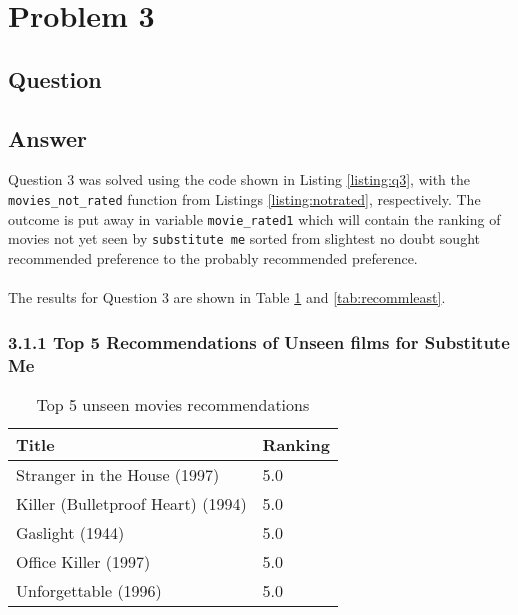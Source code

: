 \section{Problem 3}

\subsection{Question}
\vspace*{10pt}


\subsection{Answer}
\vspace{2mm}
Question 3 was solved using the code shown in Listing \ref{listing:q3}, with the {\tt movies\_not\_rated} function from Listings \ref{listing:notrated}, respectively. The outcome is put away in variable {\tt movie\_rated1} which will contain the ranking of movies not yet seen by  {\tt substitute me} sorted from slightest no doubt sought recommended preference to the probably recommended preference.\\
\\
The results for Question 3 are shown in Table \ref{tab:recommtop} and \ref{tab:recommleast}. 





\subsubsection{3.1.1 Top 5 Recommendations of Unseen films for Substitute Me }
\vspace{5mm}
\begin{table}[h!]
\centering
\begin{tabular}{| l | l |}
\hline
Title & Ranking \\
\hline
Stranger in the House (1997) & 5.0 \\
Killer (Bulletproof Heart) (1994) & 5.0 \\
Gaslight (1944) & 5.0 \\
Office Killer (1997) & 5.0 \\
Unforgettable (1996) & 5.0 \\
\hline
\end{tabular}
\caption{Top 5 unseen movies recommendations}
\label{tab:recommtop}
\end{table}

